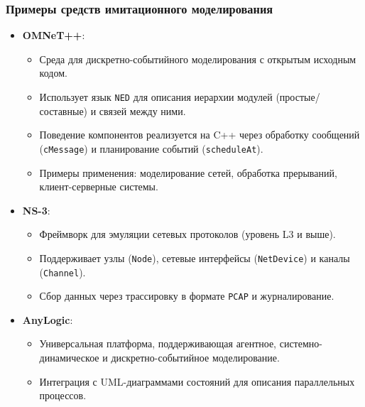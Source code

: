 \subsubsection*{Примеры средств имитационного моделирования}
\begin{itemize}
    \item \textbf{OMNeT++}:
    \begin{itemize}
        \item Среда для дискретно-событийного моделирования с открытым исходным кодом.
        \item Использует язык \texttt{NED} для описания иерархии модулей (простые/составные) и связей между ними.
        \item Поведение компонентов реализуется на C++ через обработку сообщений (\texttt{cMessage}) и планирование событий (\texttt{scheduleAt}).
        \item Примеры применения: моделирование сетей, обработка прерываний, клиент-серверные системы.
    \end{itemize}

    \item \textbf{NS-3}:
    \begin{itemize}
        \item Фреймворк для эмуляции сетевых протоколов (уровень L3 и выше).
        \item Поддерживает узлы (\texttt{Node}), сетевые интерфейсы (\texttt{NetDevice}) и каналы (\texttt{Channel}).
        \item Сбор данных через трассировку в формате \texttt{PCAP} и журналирование.
    \end{itemize}

    \item \textbf{AnyLogic}:
    \begin{itemize}
        \item Универсальная платформа, поддерживающая агентное, системно-динамическое и дискретно-событийное моделирование.
        \item Интеграция с UML-диаграммами состояний для описания параллельных процессов.
    \end{itemize}
\end{itemize}

